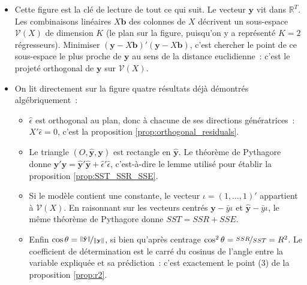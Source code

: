 \documentclass[10pt,a4paper]{article}
\theoremstyle{definition}
\renewcommand{\newline}{\unskip\par\vspace{1.5pt}}
\begin{document}
\begin{notes}

  \begin{itemize}

  \item Cette figure est la clé de lecture de tout ce qui suit. Le vecteur $\mathbf y$
    vit dans $\mathbb R^T$. Les combinaisons linéaires $X\mathbf b$ des colonnes
    de $X$ décrivent un sous-espace $\mathcal V(X)$ de dimension $K$ (le plan sur la
    figure, puisqu'on y a représenté $K=2$ régresseurs). Minimiser
    $(\mathbf y-X\mathbf b)'(\mathbf y-X\mathbf b)$, c'est chercher le point de ce
    sous-espace le plus proche de $\mathbf y$ au sens de la distance euclidienne~:
    c'est le projeté orthogonal de $\mathbf y$ sur $\mathcal V(X)$.\newline

  \item On lit directement sur la figure quatre résultats déjà démontrés
    algébriquement~:
    \begin{itemize}
    \item $\hat\epsilon$ est orthogonal au plan, donc à chacune de ses directions
      génératrices~: $X'\hat\epsilon = 0$, c'est la proposition
      \ref{prop:orthogonal_residuals}.\newline
    \item Le triangle $(O, \hat{\mathbf y}, \mathbf y)$ est rectangle en
      $\hat{\mathbf y}$. Le théorème de Pythagore donne
      $\mathbf y'\mathbf y = \hat{\mathbf y}'\hat{\mathbf y} + \hat\epsilon'\hat\epsilon$,
      c'est-à-dire le lemme utilisé pour établir la proposition
      \ref{prop:SST_SSR_SSE}.\newline
    \item Si le modèle contient une constante, le vecteur $\iota=(1,\dots,1)'$
      appartient à $\mathcal V(X)$. En raisonnant sur les vecteurs centrés
      $\mathbf y - \bar y\iota$ et $\hat{\mathbf y}-\bar y\iota$, le même théorème de
      Pythagore donne $SST = SSR + SSE$.\newline
    \item Enfin $\cos\theta = \nicefrac{\|\hat{\mathbf y}\|}{\|\mathbf y\|}$, si bien
      qu'après centrage $\cos^2\theta = \nicefrac{SSR}{SST} = R^2$. Le coefficient de
      détermination est le carré du cosinus de l'angle entre la variable expliquée et
      sa prédiction~: c'est exactement le point (3) de la proposition
      \ref{prop:r2}.
    \end{itemize}
    \medskip


\end{itemize}
\end{notes}
\end{document}
